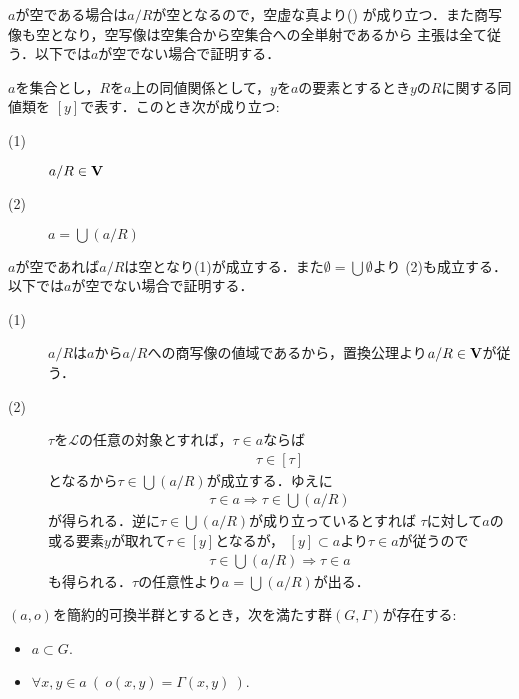 	\begin{prf}
		$a$が空である場合は$a/R$が空となるので，空虚な真より()
		が成り立つ．また商写像も空となり，空写像は空集合から空集合への全単射であるから
		主張は全て従う．以下では$a$が空でない場合で証明する．
	\end{prf}
	
	\begin{screen}
		\begin{thm}[商集合の性質]
			$a$を集合とし，$R$を$a$上の同値関係として，$y$を$a$の要素とするとき$y$の$R$に関する同値類を
			$[y]$で表す．このとき次が成り立つ:
			\begin{description}
				\item[(1)] $a/R \in \mathbf{V}$
				\item[(2)] $a = \bigcup (a/R)$
			\end{description}
		\end{thm}
	\end{screen}
	
	\begin{prf} $a$が空であれば$a/R$は空となり(1)が成立する．また$\emptyset = \bigcup \emptyset$より
		(2)も成立する．以下では$a$が空でない場合で証明する．
		\begin{description}
			\item[(1)] $a/R$は$a$から$a/R$への商写像の値域であるから，置換公理より$a/R \in \mathbf{V}$が従う．
			\item[(2)] $\tau$を$\mathcal{L}$の任意の対象とすれば，$\tau \in a$ならば
				\begin{align}
					\tau \in [\tau]
				\end{align}
				となるから$\tau \in \bigcup (a/R)$が成立する．ゆえに
				\begin{align}
					\tau \in a \Longrightarrow \tau \in \bigcup (a/R)
				\end{align}
				が得られる．逆に$\tau \in \bigcup (a/R)$が成り立っているとすれば
				$\tau$に対して$a$の或る要素$y$が取れて$\tau \in [y]$となるが，
				$[y] \subset a$より$\tau \in a$が従うので
				\begin{align}
					\tau \in \bigcup (a/R) \Longrightarrow \tau \in a
				\end{align}
				も得られる．$\tau$の任意性より$a = \bigcup (a/R)$が出る．
				\QED
		\end{description}
	\end{prf}
	
	\begin{screen}
		\begin{thm}[半群の群への拡張]\label{thm:extension_of_semigroup}
			$(a,o)$を簡約的可換半群とするとき，次を満たす群$(G,\Gamma)$が存在する:
			\begin{itemize}
				\item $a \subset G$.
				\item $\forall x,y \in a\ (\ o(x,y) = \Gamma(x,y)\ )$.
			\end{itemize}
		\end{thm}
	\end{screen}
	
